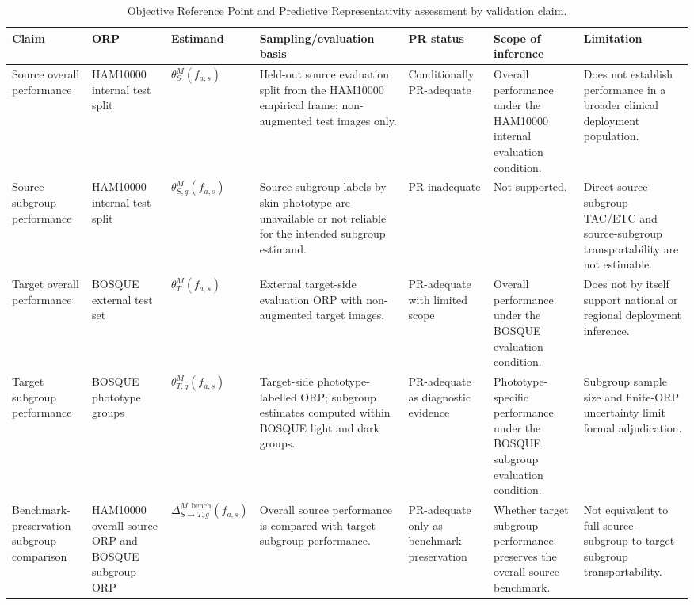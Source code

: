 \begin{table}[h!]
\centering
\scriptsize
\caption{Objective Reference Point and Predictive Representativity assessment by validation claim.}
\label{tab:orp-pr-assessment}
\setlength{\tabcolsep}{3pt}
\renewcommand{\arraystretch}{1.08}
\begin{tabular}{p{2.5cm}p{2.5cm}p{2.1cm}p{3.4cm}p{2.5cm}p{3.3cm}p{3.2cm}}
\toprule
\textbf{Claim} & \textbf{ORP} & \textbf{Estimand} & \textbf{Sampling/evaluation basis} & \textbf{PR status} & \textbf{Scope of inference} & \textbf{Limitation} \\
\midrule
Source overall performance & HAM10000 internal test split & $\theta_S^M(f_{a,s})$ & Held-out source evaluation split from the HAM10000 empirical frame; non-augmented test images only. & Conditionally PR-adequate & Overall performance under the HAM10000 internal evaluation condition. & Does not establish performance in a broader clinical deployment population. \\
\addlinespace
Source subgroup performance & HAM10000 internal test split & $\theta_{S,g}^M(f_{a,s})$ & Source subgroup labels by skin phototype are unavailable or not reliable for the intended subgroup estimand. & PR-inadequate & Not supported. & Direct source subgroup TAC/ETC and source-subgroup transportability are not estimable. \\
\addlinespace
Target overall performance & BOSQUE external test set & $\theta_T^M(f_{a,s})$ & External target-side evaluation ORP with non-augmented target images. & PR-adequate with limited scope & Overall performance under the BOSQUE evaluation condition. & Does not by itself support national or regional deployment inference. \\
\addlinespace
Target subgroup performance & BOSQUE phototype groups & $\theta_{T,g}^M(f_{a,s})$ & Target-side phototype-labelled ORP; subgroup estimates computed within BOSQUE light and dark groups. & PR-adequate as diagnostic evidence & Phototype-specific performance under the BOSQUE subgroup evaluation condition. & Subgroup sample size and finite-ORP uncertainty limit formal adjudication. \\
\addlinespace
Benchmark-preservation subgroup comparison & HAM10000 overall source ORP and BOSQUE subgroup ORP & $\Delta_{S\to T,g}^{M,\mathrm{bench}}(f_{a,s})$ & Overall source performance is compared with target subgroup performance. & PR-adequate only as benchmark preservation & Whether target subgroup performance preserves the overall source benchmark. & Not equivalent to full source-subgroup-to-target-subgroup transportability. \\

\end{tabular}
\end{table}
